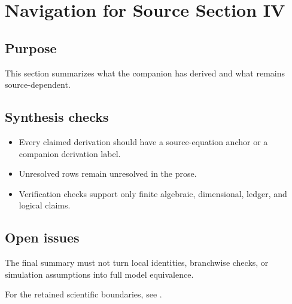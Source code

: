 \section{Navigation for Source Section IV}
\label{sec:summary-navigation}


\subsection*{Purpose}

This section summarizes what the companion has derived and what remains
source-dependent.

\subsection*{Synthesis checks}

\begin{itemize}
\item Every claimed derivation should have a source-equation anchor or a
  companion derivation label.
\item Unresolved rows remain unresolved in the prose.
\item Verification checks support only finite algebraic, dimensional, ledger,
  and logical claims.
\end{itemize}

\subsection*{Open issues}

The final summary must not turn local identities, branchwise checks, or
simulation assumptions into full model equivalence.

For the retained scientific boundaries, see
.
